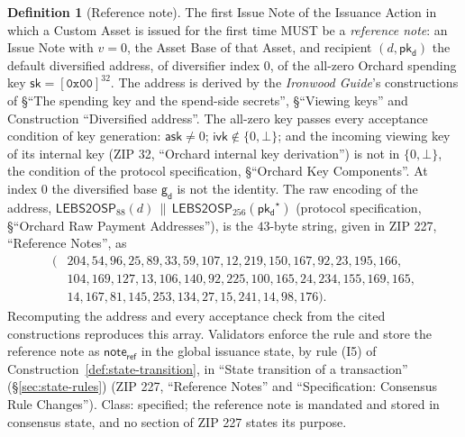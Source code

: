 \documentclass[11pt,a4paper]{article}
\theoremstyle{definition}
\newtheorem{definition}[theorem]{Definition}
\newcommand{\ask}{\ensuremath{\mathsf{ask}}}
\newcommand{\ivk}{\ensuremath{\mathsf{ivk}}}
\newcommand{\pkd}{\ensuremath{\mathsf{pk_d}}}
\newcommand{\gd}{\ensuremath{\mathsf{g_d}}}
\begin{document}
\begin{definition}[Reference note]\label{def:reference-note}
The first Issue Note of the Issuance Action in which a Custom Asset is
issued for the first time MUST be a \emph{reference note}: an Issue Note
with $v = 0$, the Asset Base of that Asset, and recipient $(d, \pkd)$ the
default diversified address, of diversifier index $0$, of the all-zero
Orchard spending key $\mathsf{sk} = [\mathtt{0x00}]^{32}$. The address is
derived by the \emph{Ironwood Guide}'s constructions of \S``The spending
key and the spend-side secrets'', \S``Viewing keys'' and Construction
``Diversified address''. The all-zero key passes every acceptance condition
of key generation: $\ask \neq 0$; $\ivk \notin \{0, \bot\}$; and the
incoming viewing key of its internal key (ZIP 32, ``Orchard internal key
derivation'') is not in $\{0, \bot\}$, the condition of the protocol
specification, \S``Orchard Key Components''. At index $0$ the diversified
base $\gd$ is not the identity. The raw encoding of the address,
$\mathsf{LEBS2OSP}_{88}(d) \,\|\, \mathsf{LEBS2OSP}_{256}(\pkd^{\star})$
(protocol specification, \S``Orchard Raw Payment Addresses''), is the
$43$-byte string, given in ZIP 227, ``Reference Notes'', as
\begin{align*}
  (&204, 54, 96, 25, 89, 33, 59, 107, 12, 219, 150, 167, 92, 23, 195,
    166, \\
   &104, 169, 127, 13, 106, 140, 92, 225, 100, 165, 24, 234, 155, 169,
    165, \\
   &14, 167, 81, 145, 253, 134, 27, 15, 241, 14, 98, 176).
\end{align*}
Recomputing the address and every acceptance check from the cited
constructions reproduces this array. Validators enforce the rule and store the
reference note as $\mathsf{note}_{\mathsf{ref}}$ in the global issuance
state, by rule (I5) of Construction~\ref{def:state-transition}, in ``State
transition of a transaction'' (\S\ref{sec:state-rules}) (ZIP 227,
``Reference Notes'' and ``Specification: Consensus Rule Changes''). Class:
specified; the reference note is mandated and stored in consensus state,
and no section of ZIP 227 states its purpose.
\end{definition}
\end{document}
